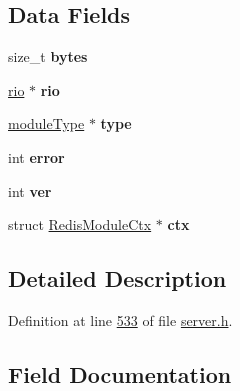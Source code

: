 \subsection*{Data Fields}
\begin{DoxyCompactItemize}
\item 
\mbox{\label{structRedisModuleIO_a4c2faf1f14cb4c8791d785c71882d122}} 
size\+\_\+t {\bfseries bytes}
\item 
\mbox{\label{structRedisModuleIO_a8133d961a0c54b069bf0b86d7a5eed33}} 
\hyperlink{struct__rio}{rio} $\ast$ {\bfseries rio}
\item 
\mbox{\label{structRedisModuleIO_a3ebe47e7c057c519b95410f07d52ea26}} 
\hyperlink{structRedisModuleType}{module\+Type} $\ast$ {\bfseries type}
\item 
\mbox{\label{structRedisModuleIO_adfb3643a332a0a6b2811b44eba1c5c6d}} 
int {\bfseries error}
\item 
\mbox{\label{structRedisModuleIO_a4356f9b503d1f032cc7e700ee6d0b69d}} 
int {\bfseries ver}
\item 
\mbox{\label{structRedisModuleIO_afd3a53e1503fcfc794573a3ebcddc83c}} 
struct \hyperlink{structRedisModuleCtx}{Redis\+Module\+Ctx} $\ast$ {\bfseries ctx}
\end{DoxyCompactItemize}


\subsection{Detailed Description}


Definition at line \hyperlink{server_8h_source_l00533}{533} of file \hyperlink{server_8h_source}{server.\+h}.



\subsection{Field Documentation}
\mbox{\label{structRedisModuleIO_a4c2faf1f14cb4c8791d785c71882d122}} 
